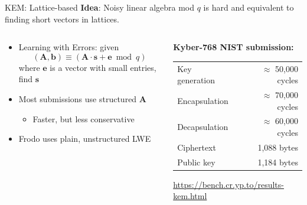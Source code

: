 \documentclass[xcolor=table,10pt,aspectratio=169]{beamer}
\begin{document}
\begin{frame}[label={sec:org3bb8c06}]{KEM: Lattice-based}
\textbf{Idea}: Noisy linear algebra mod \(q\) is hard and equivalent to finding short vectors in lattices.

\begin{columns}[t]
\begin{column}{0.5\columnwidth}
\begin{itemize}
\item Learning with Errors: given \[(\mathbf{A}, \mathbf{b}) \equiv (\mathbf{A} \cdot \mathbf{s} + \mathbf{e} \bmod q)\] where \(\mathbf{e}\) is a vector with small entries, find \(\mathbf{s}\)
\item Most submissions use structured \(\mathbf{A}\)
\begin{itemize}
\item Faster, but less conservative
\end{itemize}
\item Frodo uses plain, unstructured LWE
\end{itemize}
\end{column}

\begin{column}{0.5\columnwidth}
\textbf{Kyber-768 NIST submission:}

\begin{center}
\begin{tabular}{lr}
Key generation & \(\approx\)  50,000 cycles\\
Encapsulation & \(\approx\)  70,000 cycles\\
Decapsulation & \(\approx\)  60,000 cycles\\
Ciphertext & 1,088 bytes\\
Public key & 1,184 bytes\\
\end{tabular}

\end{center}

\small \url{https://bench.cr.yp.to/results-kem.html}
\end{column}
\end{columns}
\end{frame}
\end{document}
